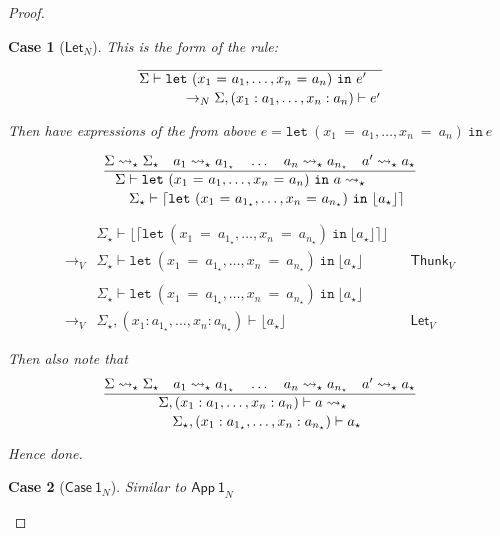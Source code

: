 \documentclass[float=false, crop=false]{standalone}
\newtheorem{case}{Case}
\numberwithin{subcase}{case}
\newcommand{\tlang}{\star}
\newcommand{\thunk}[1]{\lceil #1 \rceil}
\newcommand{\unwrap}[1]{\lfloor #1 \rfloor}
\newcommand{\tcbn}{\rightarrow_N}
\newcommand{\tcbv}{\rightarrow_V}
\newcommand{\tlthunk}{\rightsquigarrow_\tlang}
\begin{document}
\begin{proof}
\begin{case}[$\mathsf{Let}_N$]
    This is the form of the rule:
    \[
  \dfrac{}{\splitdfrac{\Sigma \vdash \mathtt{let}\ 
      (x_1\ \mathtt{=}\ a_1,\dotsc, x_n\ \mathtt{=}\ a_n)\ \mathtt{in}\ e'}
    {\tcbn \Sigma,(x_1:a_1,\dotsc,x_n:a_n) \vdash e'}} \]

  Then have expressions of the from above 
  $e = \mathtt{let}\ (x_1\ \mathtt{=}\ a_1,\dotsc, x_n\ \mathtt{=}\ a_n)\ \mathtt{in}\ e$
  
\[\dfrac{\Sigma \tlthunk \Sigma_\tlang \quad a_1  \tlthunk a_{1_\tlang} 
    \quad \dots \quad a_n \tlthunk a_{n_\tlang} \quad a' \tlthunk a_\tlang}
  {\splitdfrac{\Sigma \vdash \mathtt{let}\ (x_1\ \mathtt{=}\ a_1,\dotsc, 
      x_n\ \mathtt{=}\ a_n)\ \mathtt{in}\ a \tlthunk}
    {\Sigma_\tlang \vdash \thunk{\mathtt{let}\ 
        (x_1\ \mathtt{=}\ a_{1_\tlang},\dotsc, x_n\ \mathtt{=}\ a_{n_\tlang})
        \ \mathtt{in}\ \unwrap{a_\tlang}}}} \]

\begin{align*} 
  & \Sigma_\tlang \vdash \unwrap{\thunk{\mathtt{let}\ 
        (x_1\ \mathtt{=}\ a_{1_\tlang},\dotsc, x_n\ \mathtt{=}\ a_{n_\tlang})
        \ \mathtt{in}\ \unwrap{a_\tlang}}}\\ \tcbv &\Sigma_\tlang \vdash
    \mathtt{let}\ (x_1\ \mathtt{=}\ a_{1_\tlang},
    \dotsc, x_n\ \mathtt{=}\ a_{n_\tlang})
    \ \mathtt{in}\ \unwrap{a_\tlang} && \mathsf{Thunk}_V \\ \\
  & \Sigma_\tlang \vdash \mathtt{let}\ 
    (x_1\ \mathtt{=}\ a_{1_\tlang},\dotsc, x_n\ \mathtt{=}\ a_{n_\tlang})
    \ \mathtt{in}\ \unwrap{a_\tlang}\\ \tcbv &\Sigma_\tlang,
    (x_1:a_{1_\tlang},\dotsc,x_n:a_{n_\tlang}) \vdash 
    \unwrap{a_\tlang} && \mathsf{Let}_V
\end{align*}

Then also note that 
\[
  \dfrac{\Sigma \tlthunk \Sigma_\tlang \quad a_1  
    \tlthunk a_{1_\tlang} \quad \dots \quad a_n 
    \tlthunk a_{n_\tlang} \quad a' \tlthunk a_\tlang}
  {\splitdfrac{\Sigma,(x_1:a_1,\dotsc,x_n:a_n) \vdash a \tlthunk}
   {\Sigma_\tlang,(x_1:a_{1_\tlang},\dotsc,x_n:a_{n_\tlang}) \vdash a_\tlang} }
\]

    Hence done.
\end{case}

\begin{case}[$\mathsf{Case\ 1}_N$]
Similar to $\mathsf{App\ 1}_N$
\end{case}


\end{proof}
\end{document}
